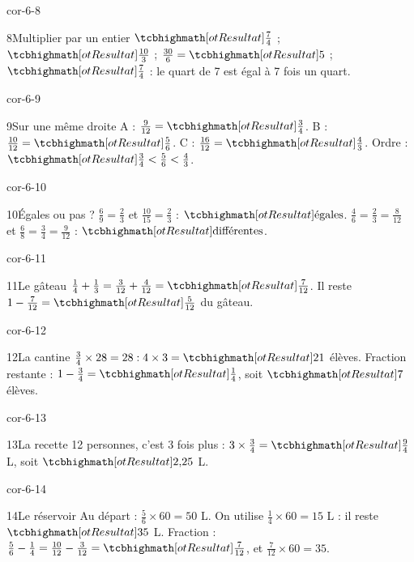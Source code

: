 \begin{blocLivre}{cor-6-8}\begin{corrige}{8}{Multiplier par un entier}
$\res{\frac74}$ ; $\res{\frac{10}3}$ ; $\frac{30}6=\res5$ ; $\res{\frac74}$ : le quart de 7 est égal à 7 fois un quart.
\end{corrige}\end{blocLivre}
\begin{blocLivre}{cor-6-9}\begin{corrige}{9}{Sur une même droite}
A : $\frac9{12}=\res{\frac34}$. B : $\frac{10}{12}=\res{\frac56}$. C : $\frac{16}{12}=\res{\frac43}$. Ordre : $\res{\frac34<\frac56<\frac43}$.
\label{fig-cor-6-9}
\end{corrige}\end{blocLivre}
\begin{blocLivre}{cor-6-10}\begin{corrige}{10}{Égales ou pas ?}
$\frac69=\frac23$ et $\frac{10}{15}=\frac23$ : $\res{\text{égales}}$. $\frac46=\frac23=\frac8{12}$ et $\frac68=\frac34=\frac9{12}$ : $\res{\text{différentes}}$.
\end{corrige}\end{blocLivre}
\begin{blocLivre}{cor-6-11}\begin{corrige}{11}{Le gâteau}
$\frac14+\frac13=\frac3{12}+\frac4{12}=\res{\frac7{12}}$. Il reste $1-\frac7{12}=\res{\frac5{12}}$ du gâteau.
\end{corrige}\end{blocLivre}
\begin{blocLivre}{cor-6-12}\begin{corrige}{12}{La cantine}
$\frac34\times28=28:4\times3=\res{21}$ élèves. Fraction restante : $1-\frac34=\res{\frac14}$, soit $\res7$ élèves.
\end{corrige}\end{blocLivre}
\begin{blocLivre}{cor-6-13}\begin{corrige}{13}{La recette}
12 personnes, c’est 3 fois plus : $3\times\frac34=\res{\frac94}$ L, soit $\res{2{,}25}$ L.
\end{corrige}\end{blocLivre}
\begin{blocLivre}{cor-6-14}\begin{corrige}{14}{Le réservoir}
Au départ : $\frac56\times60=50$ L. On utilise $\frac14\times60=15$ L : il reste $\res{35}$ L. Fraction : $\frac56-\frac14=\frac{10}{12}-\frac3{12}=\res{\frac7{12}}$, et $\frac7{12}\times60=35$.
\end{corrige}\end{blocLivre}
